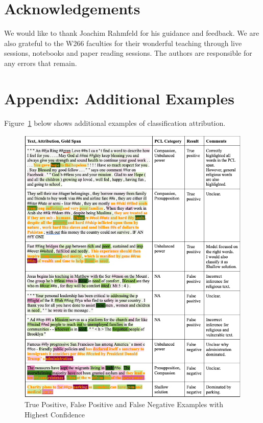 \documentclass[11pt]{article}
\begin{document}
\section*{Acknowledgements}

We would like to thank Joachim Rahmfeld for his guidance and feedback. We are also grateful to the W266 faculties for their wonderful teaching through live sessions, notebooks and paper reading sessions. The authors are responsible for any errors that remain.



\appendix

\section{Appendix: Additional Examples}
Figure~\ref{fig:fig2} below shows additional examples of classification attribution. 

\label{sec:appendix}

\begin{figure}[t]
    \centering
    \includegraphics[width=16cm]{Fig 2.png}
    \caption{True Positive, False Positive and False Negative Examples with Highest Confidence}
    \label{fig:fig2}
\end{figure}
\end{document}
